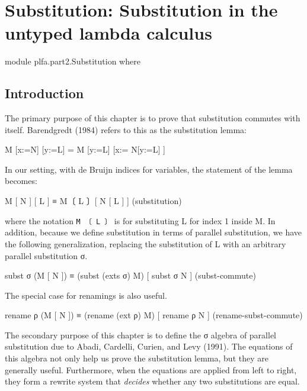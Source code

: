 \hypertarget{Substitution}{%
\chapter{Substitution: Substitution in the untyped lambda
calculus}\label{Substitution}}

\begin{fence}
\begin{code}
module plfa.part2.Substitution where
\end{code}
\end{fence}

\hypertarget{introduction}{%
\section{Introduction}\label{introduction}}

The primary purpose of this chapter is to prove that substitution
commutes with itself. Barendgredt (1984) refers to this as the
substitution lemma:

\begin{myDisplay}
M [x:=N] [y:=L] = M [y:=L] [x:= N[y:=L] ]
\end{myDisplay}

In our setting, with de Bruijn indices for variables, the statement of
the lemma becomes:

\begin{myDisplay}
M [ N ] [ L ] ≡  M〔 L 〕[ N [ L ] ]                     (substitution)
\end{myDisplay}

where the notation \texttt{M\ 〔\ L\ 〕} is for substituting L for index
1 inside M. In addition, because we define substitution in terms of
parallel substitution, we have the following generalization, replacing
the substitution of L with an arbitrary parallel substitution σ.

\begin{myDisplay}
subst σ (M [ N ]) ≡ (subst (exts σ) M) [ subst σ N ]    (subst-commute)
\end{myDisplay}

The special case for renamings is also useful.

\begin{myDisplay}
rename ρ (M [ N ]) ≡ (rename (ext ρ) M) [ rename ρ N ]
                                                 (rename-subst-commute)
\end{myDisplay}

The secondary purpose of this chapter is to define the σ algebra of
parallel substitution due to Abadi, Cardelli, Curien, and Levy (1991).
The equations of this algebra not only help us prove the substitution
lemma, but they are generally useful. Furthermore, when the equations
are applied from left to right, they form a rewrite system that
\emph{decides} whether any two substitutions are equal.

